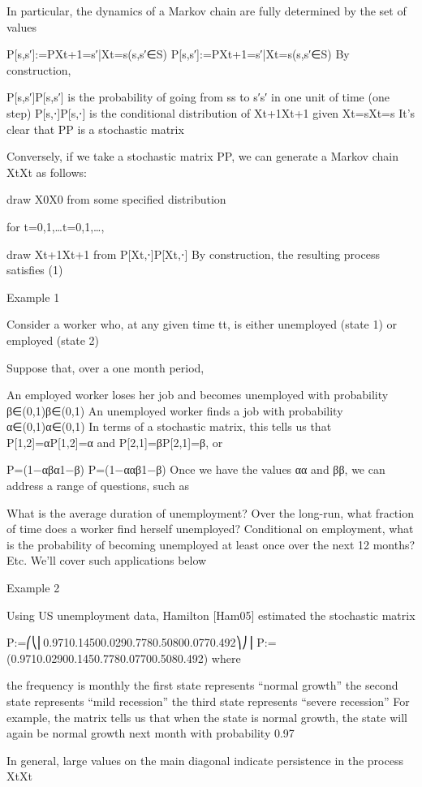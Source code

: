 In particular, the dynamics of a Markov chain are fully determined by the set of values

P[s,s′]:=P{Xt+1=s′|Xt=s}(s,s′∈S)
P[s,s′]:=P{Xt+1=s′|Xt=s}(s,s′∈S)
By construction,

P[s,s′]P[s,s′] is the probability of going from ss to s′s′ in one unit of time (one step)
P[s,⋅]P[s,⋅] is the conditional distribution of Xt+1Xt+1 given Xt=sXt=s
It’s clear that PP is a stochastic matrix

Conversely, if we take a stochastic matrix PP, we can generate a Markov chain {Xt}{Xt} as follows:

draw X0X0 from some specified distribution

for t=0,1,…t=0,1,…,

draw Xt+1Xt+1 from P[Xt,⋅]P[Xt,⋅]
By construction, the resulting process satisfies (1)

Example 1

Consider a worker who, at any given time tt, is either unemployed (state 1) or employed (state 2)

Suppose that, over a one month period,

An employed worker loses her job and becomes unemployed with probability β∈(0,1)β∈(0,1)
An unemployed worker finds a job with probability α∈(0,1)α∈(0,1)
In terms of a stochastic matrix, this tells us that P[1,2]=αP[1,2]=α and P[2,1]=βP[2,1]=β, or

P=(1−αβα1−β)
P=(1−ααβ1−β)
Once we have the values αα and ββ, we can address a range of questions, such as

What is the average duration of unemployment?
Over the long-run, what fraction of time does a worker find herself unemployed?
Conditional on employment, what is the probability of becoming unemployed at least once over the next 12 months?
Etc.
We’ll cover such applications below

Example 2

Using US unemployment data, Hamilton [Ham05] estimated the stochastic matrix

P:=⎛⎝⎜0.9710.14500.0290.7780.50800.0770.492⎞⎠⎟
P:=(0.9710.02900.1450.7780.07700.5080.492)
where

the frequency is monthly
the first state represents “normal growth”
the second state represents “mild recession”
the third state represents “severe recession”
For example, the matrix tells us that when the state is normal growth, the state will again be normal growth next month with probability 0.97

In general, large values on the main diagonal indicate persistence in the process {Xt}{Xt}

